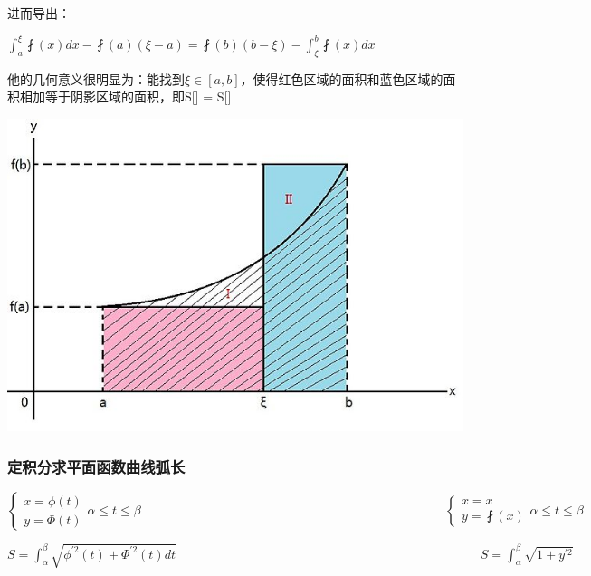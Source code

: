 \documentclass[UTF8]{ctexbook}
\newcommand{\defFunction}[1]{\fint(#1)}
\newcommand{\definiteIntegral}[2]{\int^{#1}_{#2}}
\begin{document}
{{{{进而导出：

$\definiteIntegral{\xi}{a}\defFunction{x}dx -\defFunction{a}(\xi - a) = \defFunction{b}(b - \xi) - \definiteIntegral{b}{\xi}\defFunction{x}dx$

他的几何意义很明显为：能找到$\xi\in[a,b]$，使得红色区域的面积和蓝色区域的面积相加等于阴影区域的面积，即S[\uppercase\expandafter{}] = S[\uppercase\expandafter{}]

\includegraphics{resources/Geometric_explanation_of_the_second_mean_value_theorem_for_integration.jpg}

}%

\subsubsection{定积分求平面函数曲线弧长}{

  $$
    \begin{cases}
      x = \phi(t) \\
      y = \Phi(t)
    \end{cases}
    \alpha \leq t \leq \beta
    \qquad\qquad\qquad\qquad\qquad\qquad\qquad\qquad\qquad\qquad\qquad\qquad
    \begin{cases}
      x = x \\
      y = \defFunction{x}
    \end{cases}
    \alpha \leq t \leq \beta
  $$

  $S = \definiteIntegral{\beta}{\alpha}\sqrt{\phi^{\prime 2}(t) + \Phi^{\prime 2}(t) dt}\qquad\qquad\qquad\qquad\qquad\qquad\qquad\qquad\qquad\qquad\qquad\qquad S = \definiteIntegral{\beta}{\alpha}\sqrt{1 + y^{\prime 2}}$

}}}}
\end{document}
